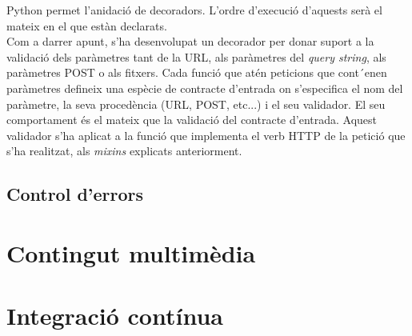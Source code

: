 Python permet l'anidació de decoradors. L'ordre d'execució d'aquests serà el mateix en el que estàn declarats. \\

Com a darrer apunt, s'ha desenvolupat un decorador per donar suport a la validació dels paràmetres tant de la \ac{URL}, als paràmetres del \emph{query string}, als paràmetres POST o als fitxers. Cada funció que atén peticions que cont´enen paràmetres defineix una espècie de contracte d'entrada on s'especifica el nom del paràmetre, la seva procedència (\ac{URL}, POST, etc...) i el seu validador. El seu comportament és el mateix que la validació del contracte d'entrada. Aquest validador s'ha aplicat a la funció que implementa el verb \ac{HTTP} de la petició que s'ha realitzat, als \emph{mixins} explicats anteriorment. 



\subsection{Control d'errors}


\section{Contingut multimèdia} \label{contingut_multimedia}
	
\section{Integració contínua}


